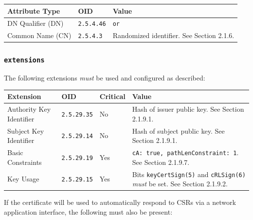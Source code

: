 \vspace*{0.5cm}
\noindent\begin{tabularx}{\textwidth}{| p{4cm} | p{2cm} | X |} \hline
\rowcolor{gray!33} Attribute Type & OID               & Value \\ \hline

DN Qualifier (DN)                 & \texttt{2.5.4.46} & \texttt{or} \\ \hline
Common Name (CN)                  & \texttt{2.5.4.3}  &  Randomized identifier. See Section 2.1.6. \\ \hline

\end{tabularx}
\vspace*{0.5cm}

\subsubsection{\texttt{extensions}}

The following extensions \textit{must} be used and configured as described:

\vspace*{0.5cm}
\noindent\begin{tabularx}{\textwidth}{| p{4cm} | p{2cm} | p{1.2cm} | X |} \hline
\rowcolor{gray!33} Extension & OID                & Critical & Value \\ \hline

Authority Key Identifier     & \texttt{2.5.29.35} & No       & Hash of issuer public key. See Section 2.1.9.1. \\ \hline
Subject Key Identifier       & \texttt{2.5.29.14} & No       & Hash of subject public key. See Section 2.1.9.1. \\ \hline
Basic Constraints            & \texttt{2.5.29.19} & Yes      & \texttt{cA: true, pathLenConstraint: 1}. See Section 2.1.9.7. \\ \hline
Key Usage                    & \texttt{2.5.29.15} & Yes      & Bits \texttt{keyCertSign(5)} and \texttt{cRLSign(6)} \textit{must} be set. See Section 2.1.9.2. \\ \hline

\end{tabularx}
\vspace*{0.5cm}

If the certificate will be used to automatically respond to CSRs via a network application interface, the following must also be present:

